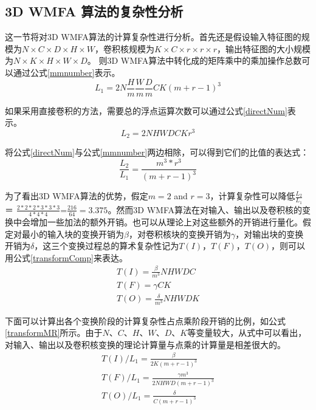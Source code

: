 \subsection{3D WMFA 算法的复杂性分析}
\label{Complexity}
这一节将对3D WMFA算法的计算复杂性进行分析。首先还是假设输入特征图的规模为$N \times C \times D \times H \times W$，卷积核规模为$K \times C \times r \times r \times r$，输出特征图的大小规模为$N \times K \times H \times W \times D$。 则3D WMFA算法中转化成的矩阵乘中的乘加操作总数可以通过公式\ref{mmnumber}表示。
\begin{equation}
\label{mmnumber}
L_1 = 2N{\frac{H}{m}}{\frac{W}{m}}{\frac{D}{m}}CK(m+r-1)^3
\end{equation}

如果采用直接卷积的方法，需要总的浮点运算次数可以通过公式\ref{directNum}表示。
\begin{equation}
\label{directNum}
L_2 = 2NHWDCKr^3
\end{equation}

将公式\ref{directNum}与公式\ref{mmnumber}两边相除，可以得到它们的比值的表达式：
\begin{equation}
\frac{L_2}{L_1} = \frac{m^3*r^3}{(m+r-1)^3}
\end{equation}

为了看出3D WMFA算法的优势，假定$m=2$ and $r=3$，计算复杂性可以降低$\frac{L_2}{L_1}$ ＝ $\frac{2*2*2*3*3*3}{4*4*4}$=$\frac{216}{64}=3.375$。然而3D WMFA算法在对输入、输出以及卷积核的变换中会增加一些加法的额外开销。也可以从理论上对这些额外的开销进行量化。假定对最小的输入块的变换开销为$\beta$，对卷积核块的变换开销为$\gamma$，对输出块的变换开销为$\delta$，这三个变换过程总的算术复杂性记为$T(I)$，$T(F)$，$T(O)$，则可以用公式\ref{transformComp}来表达。
\begin{equation}
\label{transformComp}
	\begin{split}
	T(I) = \frac{\beta}{m^3}NHWDC \\
	T(F) = \gamma CK \\
	T(O) = \frac{\delta}{m^3}NHWDK  
	\end{split}
\end{equation}

下面可以计算出各个变换阶段的计算复杂性占点乘阶段开销的比例，如公式\ref{transformMR}所示。由于$N$、$C$、$H$、$W$、$D$、$K$等变量较大，从式中可以看出，对输入、输出以及卷积核变换的理论计算量与点乘的计算量是相差很大的。
\begin{equation}
\label{transformMR}
	\begin{split}
	T(I)/L_1 =\frac{\beta}{2K(m+r-1)^3}   \\
	T(F)/L_1 = \frac{\gamma m^3}{2NHWD(m+r-1)^3} \\
	T(O) /L_1= \frac{\delta}{C(m+r-1)^3} 
	\end{split}
\end{equation}

